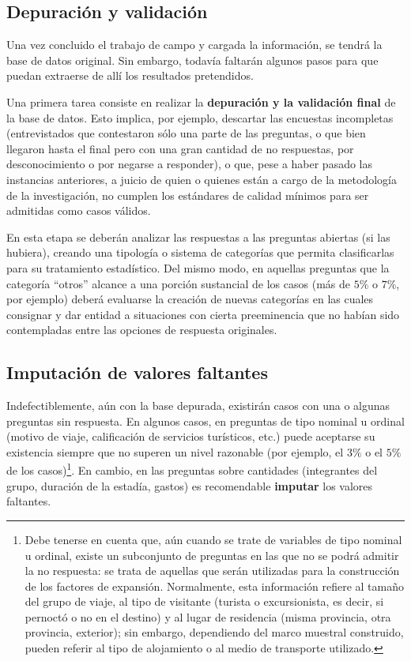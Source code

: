 \documentclass[
]{book}
\begin{document}
\hypertarget{depuraciuxf3n-y-validaciuxf3n}{%
\subsection{Depuración y validación}\label{depuraciuxf3n-y-validaciuxf3n}}

Una vez concluido el trabajo de campo y cargada la información, se tendrá la base de datos original. Sin embargo, todavía faltarán algunos pasos para que puedan extraerse de allí los resultados pretendidos.

Una primera tarea consiste en realizar la \textbf{depuración y la validación final} de la base de datos. Esto implica, por ejemplo, descartar las encuestas incompletas (entrevistados que contestaron sólo una parte de las preguntas, o que bien llegaron hasta el final pero con una gran cantidad de no respuestas, por desconocimiento o por negarse a responder), o que, pese a haber pasado las instancias anteriores, a juicio de quien o quienes están a cargo de la metodología de la investigación, no cumplen los estándares de calidad mínimos para ser admitidas como casos válidos.

En esta etapa se deberán analizar las respuestas a las preguntas abiertas (si las hubiera), creando una tipología o sistema de categorías que permita clasificarlas para su tratamiento estadístico. Del mismo modo, en aquellas preguntas que la categoría ``otros'' alcance a una porción sustancial de los casos (más de \(5\%\) o \(7\%\), por ejemplo) deberá evaluarse la creación de nuevas categorías en las cuales consignar y dar entidad a situaciones con cierta preeminencia que no habían sido contempladas entre las opciones de respuesta originales.

\hypertarget{imputaciuxf3n-de-valores-faltantes}{%
\subsection{Imputación de valores faltantes}\label{imputaciuxf3n-de-valores-faltantes}}

Indefectiblemente, aún con la base depurada, existirán casos con una o algunas preguntas sin respuesta. En algunos casos, en preguntas de tipo nominal u ordinal (motivo de viaje, calificación de servicios turísticos, etc.) puede aceptarse su existencia siempre que no superen un nivel razonable (por ejemplo, el \(3\%\) o el \(5\%\) de los casos)\footnote{Debe tenerse en cuenta que, aún cuando se trate de variables de tipo nominal u ordinal, existe un subconjunto de preguntas en las que no se podrá admitir la no respuesta: se trata de aquellas que serán utilizadas para la construcción de los factores de expansión. Normalmente, esta información refiere al tamaño del grupo de viaje, al tipo de visitante (turista o excursionista, es decir, si pernoctó o no en el destino) y al lugar de residencia (misma provincia, otra provincia, exterior); sin embargo, dependiendo del marco muestral construido, pueden referir al tipo de alojamiento o al medio de transporte utilizado.}. En cambio, en las preguntas sobre cantidades (integrantes del grupo, duración de la estadía, gastos) es recomendable \textbf{imputar} los valores faltantes.
\end{document}
